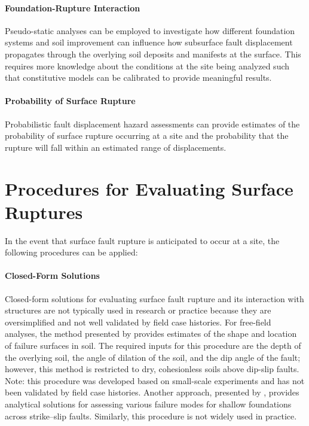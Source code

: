 \paragraph{Foundation-Rupture Interaction}
Pseudo-static analyses can be employed to investigate how different foundation systems and soil improvement can influence how subsurface fault displacement propagates through the overlying soil deposits and manifests at the surface. This requires more knowledge about the conditions at the site being analyzed such that constitutive models can be calibrated to provide meaningful results.

\paragraph{Probability of Surface Rupture}
Probabilistic fault displacement hazard assessments can provide estimates of the probability of surface rupture occurring at a site and the probability that the rupture will fall within an estimated range of displacements.

\section{Procedures for Evaluating Surface Ruptures}
\label{sec:eq_surface_rup_procedures}

In the event that surface fault rupture is anticipated to occur at a site, the following procedures can be applied:

\paragraph{Closed-Form Solutions}
Closed-form solutions for evaluating surface fault rupture and its interaction with structures are not typically used in research or practice because they are oversimplified and not well validated by field case histories. For free-field analyses, the method presented by \citet{cole1984influence} provides estimates of the shape and location of failure surfaces in soil. The required inputs for this procedure are the depth of the overlying soil, the angle of dilation of the soil, and the dip angle of the fault; however, this method is restricted to dry, cohesionless soils above dip-slip faults.  Note: this procedure was developed based on small-scale experiments and has not been validated by field case histories. Another approach, presented by \citet{berrill1983twodimensional}, provides analytical solutions for assessing various failure modes for shallow foundations across strike--slip faults. Similarly, this procedure is not widely used in practice.

